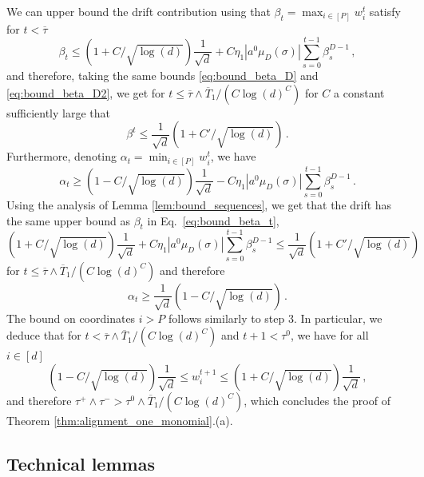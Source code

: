 \documentclass[11pt]{article}
\newcommand{\<}{\langle}
\renewcommand{\>}{\rangle}
\theoremstyle{definition}
\def\oT{\overline{T}}
\def\otau{\overline{\tau}}
\begin{document}
We can upper bound the drift contribution using that $\beta_t = \max_{i \in [P]} w_i^t$ satisfy for $t < \otau$
\begin{equation}\label{eq:beta_t_dynamics}
\beta_t  \leq (1 + C/\sqrt{\log(d)} ) \frac{1}{\sqrt{d}} + C \eta_1 |a^0 \mu_D (\sigma)| \sum_{s = 0}^{t-1} \beta_s^{D-1}\, ,
\end{equation}
and therefore, taking the same bounds \eqref{eq:bound_beta_D} and \eqref{eq:bound_beta_D2}, we get for $t \leq \otau \wedge \oT_1/ (C \log (d)^C)$ for $C$ a constant sufficiently large that
\begin{equation}\label{eq:bound_beta_t}
\beta^t \leq \frac{1}{\sqrt{d}} (1 + C'/\sqrt{\log(d)} ) \, .
\end{equation}
Furthermore, denoting $\alpha_t = \min_{i \in [P]} w_i^t$, we have
\[
\alpha_t \geq  (1 - C/\sqrt{\log(d)} ) \frac{1}{\sqrt{d}} - C \eta_1 |a^0 \mu_D (\sigma)| \sum_{s = 0}^{t-1} \beta_s^{D-1} \, .
\]
Using the analysis of Lemma \ref{lem:bound_sequences}, we get that the drift has the same upper bound as $\beta_t$ in Eq.~\eqref{eq:bound_beta_t},
\[
(1 + C/\sqrt{\log(d)} ) \frac{1}{\sqrt{d}} + C \eta_1 |a^0 \mu_D (\sigma)| \sum_{s = 0}^{t-1} \beta_s^{D-1}  \leq \frac{1}{\sqrt{d}} (1 + C'/\sqrt{\log(d)} )\, 
\]
for $t \leq \otau \wedge \oT_1/ (C \log (d)^C)$ and therefore
\[
\alpha_t \geq \frac{1}{\sqrt{d}} (1 - C/\sqrt{\log(d)} )\, .
\]
The bound on coordinates $i > P$ follows similarly to step 3. In particular, we deduce that for $t < \otau \wedge \oT_1/ (C \log (d)^C)$ and $t+1 < \tau^0$, we have for all $i \in [d]$
\[
(1 - C/\sqrt{\log(d)} ) \frac{1}{\sqrt{d}}  \leq w_i^{t+1} \leq (1 + C/\sqrt{\log(d)} ) \frac{1}{\sqrt{d}} \, , 
\]
and therefore $\tau^+ \wedge \tau^- > \tau^0 \wedge \oT_1/ (C \log (d)^C) $, which concludes the proof of Theorem \ref{thm:alignment_one_monomial}.(a).


\subsection{Technical lemmas}
\end{document}
